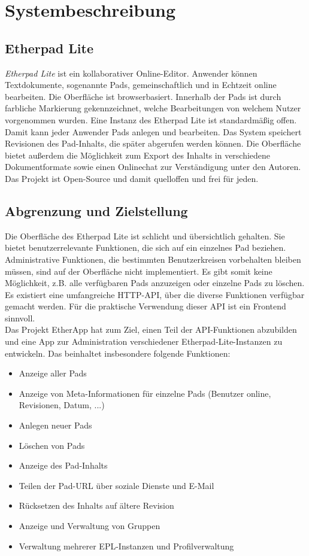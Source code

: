 \section{Systembeschreibung} %
\label{sec:system}

\subsection{Etherpad Lite}
\label{sub:system:etherpad}

\textit{Etherpad Lite} ist ein kollaborativer Online-Editor. Anwender können Textdokumente, sogenannte Pads, gemeinschaftlich und in Echtzeit online bearbeiten. Die Oberfläche ist browserbasiert. Innerhalb der Pads ist durch farbliche Markierung gekennzeichnet, welche Bearbeitungen von welchem Nutzer vorgenommen wurden. Eine Instanz des Etherpad Lite ist standardmäßig offen. Damit kann jeder Anwender Pads anlegen und bearbeiten. Das System speichert Revisionen des Pad-Inhalts, die später abgerufen werden können. Die Oberfläche bietet außerdem die Möglichkeit zum Export des Inhalts in verschiedene Dokumentformate sowie einen Onlinechat zur Verständigung unter den Autoren.\\
Das Projekt ist Open-Source und damit quelloffen und frei für jeden.

\subsection{Abgrenzung und Zielstellung}
Die Oberfläche des Etherpad Lite ist schlicht und übersichtlich gehalten. Sie bietet benutzerrelevante Funktionen, die sich auf ein einzelnes Pad beziehen. Administrative Funktionen, die bestimmten Benutzerkreisen vorbehalten bleiben müssen, sind auf der Oberfläche nicht implementiert. Es gibt somit keine Möglichkeit, z.B. alle verfügbaren Pads anzuzeigen oder einzelne Pads zu löschen.\\
Es existiert eine umfangreiche HTTP-API, über die diverse Funktionen verfügbar gemacht werden. Für die praktische Verwendung dieser API ist ein Frontend sinnvoll.\\
Das Projekt EtherApp hat zum Ziel, einen Teil der API-Funktionen abzubilden und eine App zur Administration verschiedener Etherpad-Lite-Instanzen zu entwickeln. Das beinhaltet insbesondere folgende Funktionen:
\begin{itemize}
	\item Anzeige aller Pads
	\item Anzeige von Meta-Informationen für einzelne Pads (Benutzer online, Revisionen, Datum, ...)
	\item Anlegen neuer Pads
	\item Löschen von Pads
	\item Anzeige des Pad-Inhalts
	\item Teilen der Pad-URL über soziale Dienste und E-Mail
	\item Rücksetzen des Inhalts auf ältere Revision
	\item Anzeige und Verwaltung von Gruppen
	\item Verwaltung mehrerer EPL-Instanzen und Profilverwaltung
\end{itemize}



